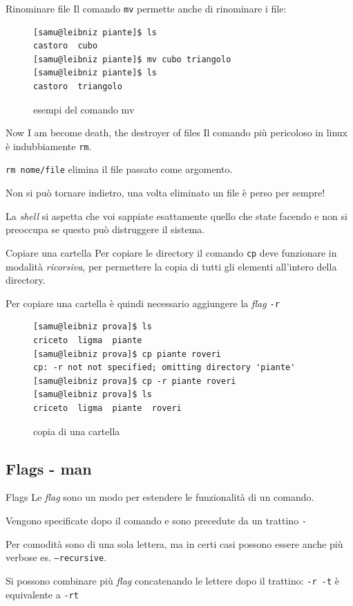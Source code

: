 \documentclass{beamer}
\begin{document}
\begin{frame}[fragile]{Rinominare file}
  Il comando \texttt{mv} permette anche di rinominare i file:
  \begin{figure}
    \begin{lstlisting}[basicstyle=\normalsize]
[samu@leibniz piante]$ ls
castoro  cubo
[samu@leibniz piante]$ mv cubo triangolo
[samu@leibniz piante]$ ls
castoro  triangolo
    \end{lstlisting}
    \caption{esempi del comando mv}
  \end{figure}
\end{frame}

\begin{frame}{Now I am become death, the destroyer of files}
  Il comando più pericoloso in linux è indubbiamente \texttt{rm}.\bigskip

  \texttt{rm nome/file} elimina il file passato come argomento.\bigskip

  Non si può tornare indietro, una volta eliminato un file è perso per 
  sempre!\bigskip

  La \textit{shell} si aspetta che voi sappiate esattamente quello che state 
  facendo e non si preoccupa se questo può distruggere il sistema.
\end{frame}

\begin{frame}[fragile]{Copiare una cartella}
  Per copiare le directory il comando \texttt{cp} deve funzionare in modalità 
  \textit{ricorsiva}, per permettere la copia di tutti gli elementi all'intero
  della directory.\bigskip

  Per copiare una cartella è quindi necessario aggiungere la \textit{flag} 
  \texttt{-r}
  \begin{figure}
    \begin{lstlisting}[basicstyle=\footnotesize]
[samu@leibniz prova]$ ls
criceto  ligma  piante
[samu@leibniz prova]$ cp piante roveri
cp: -r not not specified; omitting directory 'piante'
[samu@leibniz prova]$ cp -r piante roveri
[samu@leibniz prova]$ ls
criceto  ligma  piante  roveri
    \end{lstlisting}
    \caption{copia di una cartella}
  \end{figure}
\end{frame}

\subsection{Flags - man}
\begin{frame}{Flags}
  Le \textit{flag} sono un modo per estendere le funzionalità di un 
  comando.\bigskip

  Vengono specificate dopo il comando e sono precedute da un trattino 
  \texttt{-}\bigskip

  Per comodità sono di una sola lettera, ma in certi casi possono essere anche 
  più verbose es. \texttt{--recursive}.\bigskip

  Si possono combinare più \textit{flag} concatenando le lettere dopo il 
  trattino: \texttt{-r -t} è equivalente a \texttt{-rt}
\end{frame}
\end{document}
